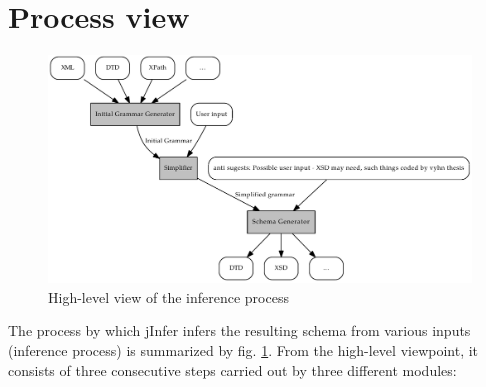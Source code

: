 \documentclass[a4paper,10pt,oneside]{article}
\newcommand{\myscale}{0.74}
\begin{document}
\section{Process view} \label{section_inference_process}
\begin{figure}
	\centering\includegraphics[scale=\myscale]{inference_process}
	\caption{High-level view of the inference process} \label{inference_process}
\end{figure}
The process by which jInfer infers the resulting schema from various inputs (inference process) is summarized by fig. \ref{inference_process}. From the high-level viewpoint, it consists of three consecutive steps carried out by three different modules:
\end{document}
